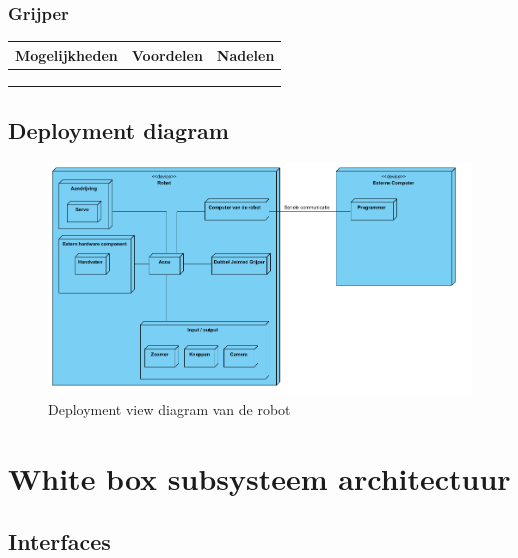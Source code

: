 \documentclass[12pt]{article} %
\begin{document}
\subsubsection{Grijper}
\begin{table}[h]
\begin{tabular}{|l|l|l|}
\hline
{\color[HTML]{3166FF} \textbf{Mogelijkheden}} & {\color[HTML]{3166FF} \textbf{Voordelen}} & {\color[HTML]{3166FF} \textbf{Nadelen}} \\ \hline
 &  & 		\\ \hline
 &  & 		\\ \hline
 &  &  		\\ \hline
\end{tabular}
\end{table}
\clearpage

\subsection{Deployment diagram}
\begin{center}
\begin{figure}[h]
\includegraphics[scale=.65]{deployment.png}
\caption{Deployment view diagram van de robot}
\label{fig:deployment}
\end{figure}
\end{center}
\clearpage
\newpage%
\section{White box subsysteem architectuur}
\label{sec:conclusion}

\subsection{Interfaces}
\end{document}
